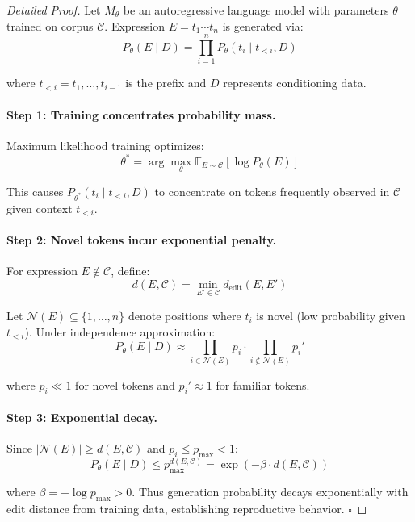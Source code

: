 \documentclass[twoside,11pt]{article}
\newcommand{\qed}{\hfill$\square$}
\begin{document}
\begin{proof}[Detailed Proof]
Let $M_\theta$ be an autoregressive language model with parameters $\theta$ trained on corpus $\mathcal{C}$. Expression $E = t_1 \cdots t_n$ is generated via:
\[
P_\theta(E \mid D) = \prod_{i=1}^n P_\theta(t_i \mid t_{<i}, D)
\]

where $t_{<i} = t_1, \ldots, t_{i-1}$ is the prefix and $D$ represents conditioning data.

\paragraph{Step 1: Training concentrates probability mass.}

Maximum likelihood training optimizes:
\[
\theta^* = \arg\max_\theta \mathbb{E}_{E \sim \mathcal{C}}[\log P_\theta(E)]
\]

This causes $P_{\theta^*}(t_i \mid t_{<i}, D)$ to concentrate on tokens frequently observed in $\mathcal{C}$ given context $t_{<i}$.

\paragraph{Step 2: Novel tokens incur exponential penalty.}

For expression $E \notin \mathcal{C}$, define:
\[
d(E, \mathcal{C}) = \min_{E' \in \mathcal{C}} d_{\text{edit}}(E, E')
\]

Let $\mathcal{N}(E) \subseteq \{1, \ldots, n\}$ denote positions where $t_i$ is novel (low probability given $t_{<i}$). Under independence approximation:
\[
P_\theta(E \mid D) \approx \prod_{i \in \mathcal{N}(E)} p_i \cdot \prod_{i \notin \mathcal{N}(E)} p_i'
\]

where $p_i \ll 1$ for novel tokens and $p_i' \approx 1$ for familiar tokens.

\paragraph{Step 3: Exponential decay.}

Since $|\mathcal{N}(E)| \geq d(E, \mathcal{C})$ and $p_i \leq p_{\max} < 1$:
\[
P_\theta(E \mid D) \leq p_{\max}^{d(E, \mathcal{C})} = \exp(-\beta \cdot d(E, \mathcal{C}))
\]

where $\beta = -\log p_{\max} > 0$. Thus generation probability decays exponentially with edit distance from training data, establishing reproductive behavior. \qed
\end{proof}
\end{document}
